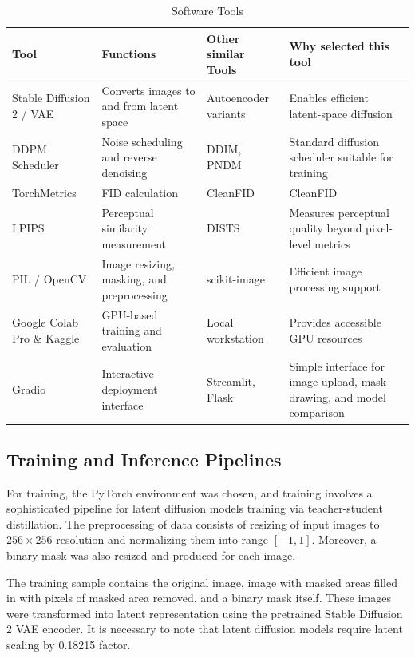 \documentclass[journal]{IEEEtran}
\begin{document}
\begin{table}[t]
\caption{Software Tools}
\label{tab:tools}
\centering
\footnotesize
\setlength{\tabcolsep}{5pt}
\begin{tabular}{p{}p{}p{}p{}}
\toprule
Tool & Functions & Other similar Tools & Why selected this tool \\
\midrule
Stable Diffusion 2 / VAE & Converts images to and from latent space & Autoencoder variants & Enables efficient latent-space diffusion \\
DDPM Scheduler & Noise scheduling and reverse denoising & DDIM, PNDM & Standard diffusion scheduler suitable for training \\
TorchMetrics & FID calculation & CleanFID & CleanFID \\
LPIPS & Perceptual similarity measurement & DISTS & Measures perceptual quality beyond pixel-level metrics \\
PIL / OpenCV & Image resizing, masking, and preprocessing & scikit-image & Efficient image processing support \\
Google Colab Pro \& Kaggle & GPU-based training and evaluation & Local workstation & Provides accessible GPU resources \\
Gradio & Interactive deployment interface & Streamlit, Flask & Simple interface for image upload, mask drawing, and model comparison \\
\bottomrule
\end{tabular}
\end{table}

\subsection{Training and Inference Pipelines}
For training, the PyTorch environment was chosen, and training involves a sophisticated pipeline for latent diffusion models training via teacher-student distillation. The preprocessing of data consists of resizing of input images to $256\times256$ resolution and normalizing them into range $[-1,1]$. Moreover, a binary mask was also resized and produced for each image.

The training sample contains the original image, image with masked areas filled in with pixels of masked area removed, and a binary mask itself. These images were transformed into latent representation using the pretrained Stable Diffusion 2 VAE encoder. It is necessary to note that latent diffusion models require latent scaling by 0.18215 factor.
\end{document}
